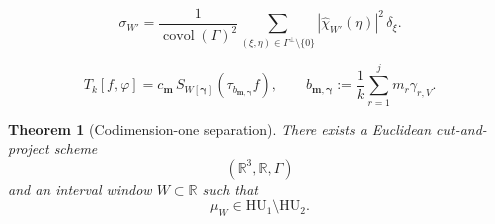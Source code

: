 \documentclass[10pt,a4paper]{amsart}
\newtheorem{theorem}{Theorem}
\newcommand{\HU}{\mathrm{HU}}
\begin{document}
\begin{equation}\label{eq:cap-diffraction-formula}
  \sigma_{W'}
  =\frac{1}{\operatorname{covol}(\Gamma)^2}
   \sum_{(\xi,\eta)\in\Gamma^\perp\setminus\{0\}}
     |\widehat{\chi}_{W'}(\eta)|^2\,\delta_\xi.
\end{equation}

\begin{equation}\label{eq:cap-isolated-derived-window-statistic}
  T_k[f,\varphi]
  =c_{\mathbf m}\,
    S_{W[\boldsymbol\gamma]}
      (\tau_{b_{\mathbf m,\boldsymbol\gamma}}f),
  \qquad
  b_{\mathbf m,\boldsymbol\gamma}
  :=\frac1k\sum_{r=1}^j m_r\gamma_{r,V}.
\end{equation}

\begin{theorem}[Codimension-one separation]
\label{thm:cap-codim-one-separation}
There exists a Euclidean cut-and-project scheme
\[
  (\mathbb R^3,\mathbb R,\Gamma)
\]
and an interval window $W\subset\mathbb R$ such that
\begin{equation}\label{eq:cap-codim-one-separation}
  \mu_W\in\HU_1\setminus\HU_2.
\end{equation}
\end{theorem}
\end{document}
